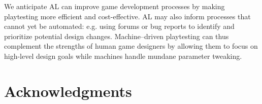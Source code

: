 \documentclass{sig-alternate}
\begin{document}
We anticipate AL can improve game development processes by making playtesting more efficient and cost-effective.
AL may also inform processes that cannot yet be automated: e.g. using forums or bug reports to identify and prioritize potential design changes.
Machine--driven playtesting can thus complement the strengths of human game designers by allowing them to focus on high-level design goals while machines handle mundane parameter tweaking.




\section{Acknowledgments}



\end{document}
